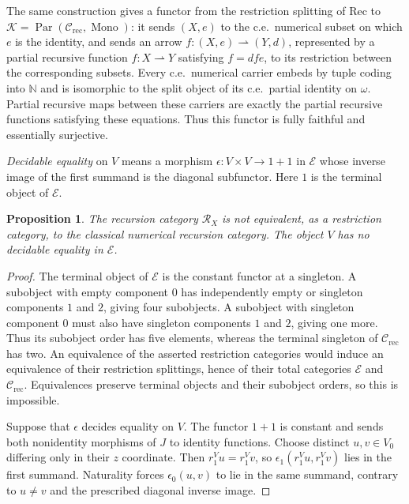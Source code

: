 \documentclass[11pt]{article}
\newtheorem{proposition}[theorem]{Proposition}
\newcommand{\N}{\mathbb N}
\begin{document}
The same construction gives a functor from the restriction splitting
of $\mathrm{Rec}$ to
$\mathcal K=\operatorname{Par}(\mathcal C_{\mathrm{rec}},
\operatorname{Mono})$: it sends $(X,e)$ to the c.e.\ numerical subset
on which $e$ is the identity, and sends an arrow
$f:(X,e)\rightharpoonup(Y,d)$, represented by a partial recursive
function $f:X\rightharpoonup Y$ satisfying $f=dfe$, to its
restriction between the corresponding subsets. Every c.e.\
numerical carrier embeds by tuple coding into $\N$ and is
isomorphic to the split object of its c.e.\ partial identity
on $\omega$. Partial recursive maps between these carriers are
exactly the partial recursive functions satisfying these equations.
Thus this functor is fully faithful and essentially surjective.

\emph{Decidable equality} on $V$ means a morphism
$\epsilon:V\times V\to1+1$ in $\mathcal E$ whose inverse image of
the first summand is the diagonal subfunctor. Here $1$ is the terminal object of $\mathcal E$.

\begin{proposition}\label{prop:fork-distinction}
The recursion category $\mathscr R_X$ is not equivalent, as a
restriction category, to the classical numerical recursion category.
The object $V$ has no decidable equality in $\mathcal E$.
\end{proposition}
\begin{proof}
The terminal object of $\mathcal E$ is the constant functor at a singleton.
A subobject with empty component $0$ has independently empty or
singleton components $1$ and $2$, giving four subobjects. A
subobject with singleton component $0$ must also have singleton
components $1$ and $2$, giving one more. Thus its subobject order has five elements, whereas
the terminal singleton of $\mathcal C_{\mathrm{rec}}$ has two.
An equivalence of the asserted restriction categories would induce
an equivalence of their restriction splittings, hence of their
total categories $\mathcal E$ and $\mathcal C_{\mathrm{rec}}$.
Equivalences preserve terminal objects and their subobject orders,
so this is impossible.

Suppose that $\epsilon$ decides equality on $V$. The functor $1+1$
is constant and sends both nonidentity morphisms of $J$ to
identity functions. Choose distinct $u,v\in V_0$ differing only
in their $z$ coordinate. Then $r_1^Vu=r_1^Vv$, so
$\epsilon_1(r_1^Vu,r_1^Vv)$ lies in the first summand.
Naturality forces $\epsilon_0(u,v)$ to lie in the same summand,
contrary to $u\ne v$ and the prescribed diagonal inverse image.
\end{proof}
\end{document}
